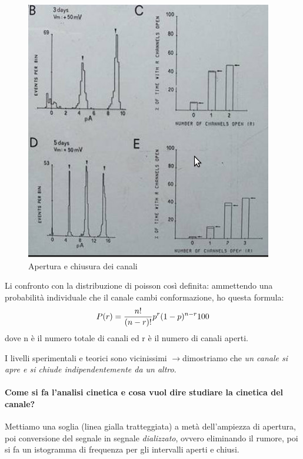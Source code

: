 \documentclass[a4paper,12pt]{article}
\newcommand{\lfreccia}{\ensuremath{\longrightarrow}}
\begin{document}
\begin{figure}[H]
\centering
\includegraphics[scale=0.4]{immagine/picchi.jpg}
\caption{Apertura e chiusura dei canali}
\end{figure}

Li confronto con la distribuzione di poisson così definita: ammettendo una probabilità individuale che il canale cambi conformazione, ho questa formula:
\begin{equation}
\centering
P(r)={\frac{n!}{(n-r)!}} p^{r} (1-p)^{n-r} 100
\end{equation}
dove n è il numero totale di canali ed r è il numero di canali aperti.

I livelli sperimentali e teorici sono vicinissimi \lfreccia dimostriamo che \emph{un canale si apre e si chiude indipendentemente da un altro}.

\paragraph{Come si fa l'analisi cinetica e cosa vuol dire studiare la cinetica del canale?}
Mettiamo una soglia (linea gialla tratteggiata) a metà dell'ampiezza di apertura, poi conversione del segnale in segnale \emph{dializzato}, ovvero eliminando il rumore, poi si fa un istogramma di frequenza per gli intervalli aperti e chiusi. 
\end{document}
